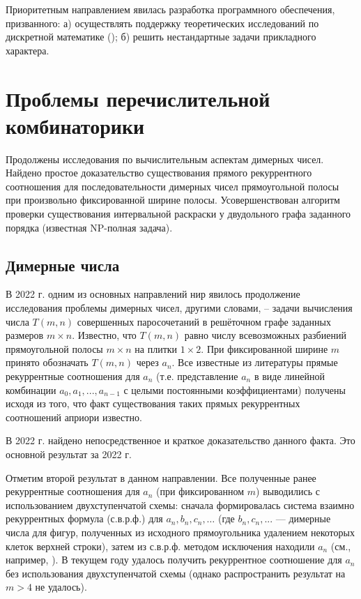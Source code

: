 Приоритетным направлением явилась разработка программного обеспечения, призванного: а) осуществлять поддержку теоретических исследований по дискретной математике (\cite{akm-bib-m9, akm-bib-m10, akm-bib-m14, akm-bib-m15}); б) решить нестандартные задачи прикладного характера.


\section{Проблемы перечислительной комбинаторики}

Продолжены исследования по вычислительным аспектам димерных чисел. Найдено простое доказательство существования прямого рекуррентного соотношения для последовательности димерных чисел прямоугольной полосы при произвольно фиксированной ширине полосы. Усовершенствован алгоритм проверки существования интервальной раскраски у двудольного графа заданного порядка (известная NP-полная задача).


\subsection{Димерные числа}

В 2022 г. одним из основных направлений нир явилось продолжение исследования проблемы димерных чисел, другими словами, -- задачи вычисления числа $T(m,n)$ совершенных паросочетаний в решёточном графе заданных размеров $m\times n$. Известно, что $T(m,n)$ равно числу всевозможных разбиений прямоугольной полосы $m\times n$ на плитки $1\times 2$. При фиксированной ширине $m$ принято обозначать $T(m,n)$ через $a_n$. Все известные из литературы прямые рекуррентные соотношения для $a_n$ (т.е. представление $a_n$ в виде линейной комбинации $a_0, a_1,..., a_{n-1}$ с целыми постоянными коэффициентами) получены исходя из того, что факт существования таких прямых рекуррентных соотношений априори известно.

В 2022 г. найдено непосредственное и краткое доказательство данного факта. Это основной результат за 2022 г.

Отметим второй результат в данном направлении. Все полученные ранее рекуррентные соотношения для 
$a_n$ (при фиксированном $m$) выводились с использованием двухступенчатой схемы: сначала формировалась система взаимно рекуррентных формула (с.в.р.ф.) для $a_n, b_n, c_n, \dots$ (где $b_n, c_n, ...$  --- димерные числа для фигур, полученных из исходного прямоугольника удалением некоторых клеток верхней строки), затем из с.в.р.ф. методом исключения находили $a_n$ (см., например, \cite{akm-bib-m3}). В текущем году удалось получить рекуррентное соотношение для $a_n$ без использования двухступенчатой схемы (однако распространить результат на $m>4$ не удалось).

